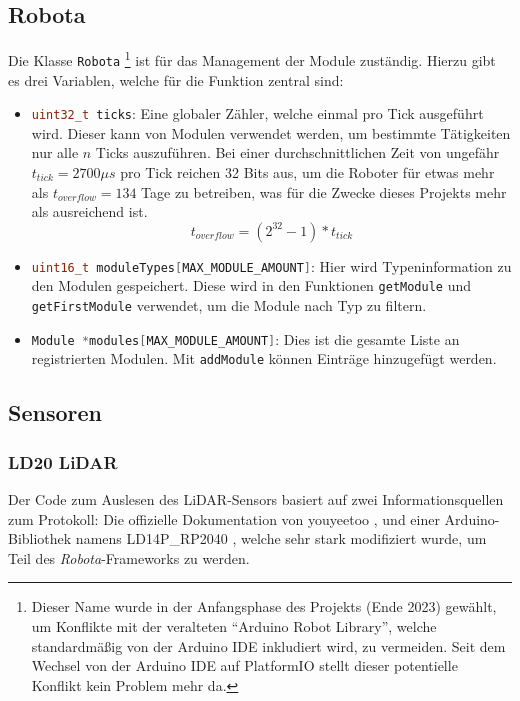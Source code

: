 \subsection{Robota}
Die Klasse \texttt{Robota}%
\footnote{Dieser Name wurde in der Anfangsphase des Projekts (Ende 2023) gewählt, 
        um Konflikte mit der veralteten ``Arduino Robot Library'',
        welche standardmäßig von der Arduino IDE inkludiert wird,
        zu vermeiden.
        Seit dem Wechsel von der Arduino IDE auf PlatformIO stellt dieser potentielle Konflikt kein Problem mehr da.
        }
ist für das Management der Module zuständig.
%
Hierzu gibt es drei Variablen, welche für die Funktion zentral sind:
\begin{itemize}
    \item \lstinline[language=c]|uint32_t ticks|:
        Eine globaler Zähler, welche einmal pro Tick ausgeführt wird.
        Dieser kann von Modulen verwendet werden, um bestimmte Tätigkeiten nur alle $n$ Ticks auszuführen.
        Bei einer durchschnittlichen Zeit von ungefähr $t_{tick}=2700\mu s$ pro Tick reichen 32 Bits aus,
        um die Roboter für etwas mehr als $t_{overflow}=134$ Tage zu betreiben,
        was für die Zwecke dieses Projekts mehr als ausreichend ist.
        \begin{equation*}
            t_{overflow} = (2^{32}-1) * t_{tick}
        \end{equation*}
    \item \lstinline[language=c]|uint16_t moduleTypes[MAX_MODULE_AMOUNT]|:
        Hier wird Typeninformation zu den Modulen gespeichert.
        Diese wird in den Funktionen \texttt{getModule} und \texttt{getFirstModule} verwendet,
        um die Module nach Typ zu filtern.
    \item \lstinline[language=c]|Module *modules[MAX_MODULE_AMOUNT]|:
        Dies ist die gesamte Liste an registrierten Modulen.
        Mit \texttt{addModule} können Einträge hinzugefügt werden.
\end{itemize}

\subsection{Sensoren}
\subsubsection{LD20 LiDAR}
Der Code zum Auslesen des LiDAR-Sensors basiert auf zwei Informationsquellen zum Protokoll:
%
Die offizielle Dokumentation von youyeetoo \cite{youyeetoo-ld20},
und einer Arduino-Bibliothek namens LD14P\_RP2040 \cite{ld20-library},
welche sehr stark modifiziert wurde, um Teil des \textit{Robota}-Frameworks zu werden.


